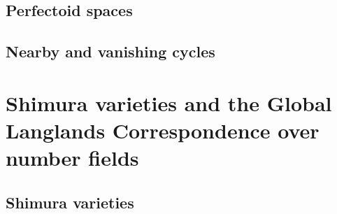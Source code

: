     \begin{appendices}
        \chapter{Perfectoid spaces}
            \begin{abstract}
                
            \end{abstract}
            
            \minitoc
            
            
            
            
    
        \chapter{Nearby and vanishing cycles}
            \begin{abstract}
                
            \end{abstract}
            
            \minitoc
            
            
            
            
    \end{appendices}
    
    \part{Shimura varieties and the Global Langlands Correspondence over number fields}
        \chapter{Shimura varieties}
            \begin{abstract}
                
            \end{abstract}
            
            \minitoc
            
            
            
            
            
